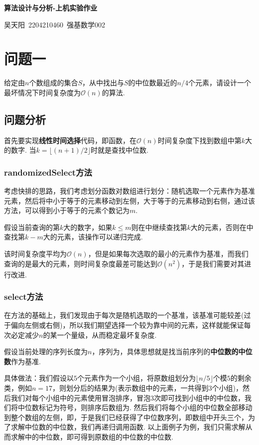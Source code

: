 \documentclass[12pt, a4paper, oneside]{ctexart}
\numberwithin{equation}{section}  %
\newenvironment{myTitle}[1]{
    \begin{center}
    {\zihao{-2}\bf #1\\}
    \zihao{-4}\it
}{\end{center}}  %
\let\leq=\leqslant %
\def\O{\mathcal{O}}          %
\begin{document}
\begin{myTitle}{算法设计与分析-上机实验作业}
    吴天阳\ 2204210460\ 强基数学002
\end{myTitle}
\section{问题一}
给定由$n$个数组成的集合$S$，从中找出与$S$的中位数最近的$n/4$个元素，请设计一个最坏情况下时间复杂度为$\O(n)$的算法.
\subsection{问题分析}
首先要实现\textbf{线性时间选择}代码，即函数，在$\O(n)$时间复杂度下找到数组中第$k$大的数字. 当$k = \lfloor(n+1)/2\rfloor$时就是查找中位数.

\subsubsection{randomizedSelect方法}
考虑快排的思路，我们考虑划分函数对数组进行划分：随机选取一个元素作为基准元素，然后将中小于等于的元素移动到左侧，大于等于的元素移动到右侧，通过该方法，可以得到小于等于的元素个数记为$m$.

假设当前查询的第$k$大的数字，如果$k\leq m$则在中继续查找第$k$大的元素，否则在中查找第$k-m$大的元素，该操作可以递归完成.

该时间复杂度平均为$\O(n)$，但是如果每次选取的最小的元素作为基准，而我们查询的是最大的元素，则时间复杂度最差可能达到$\O(n^2)$，于是我们需要对其进行改进.
\subsubsection{select方法}
在方法的基础上，我们发现由于每次是随机选取的一个基准，该基准可能较差(过于偏向左侧或右侧)，所以我们期望选择一个较为靠中间的元素，这样就能保证每次必定减少$n$的某一个量级，从而稳定最坏复杂度.

假设当前处理的序列长度为$n$，序列为，具体思想就是找当前序列的\textbf{中位数的中位数}作为基准.

具体做法：我们假设以$5$个元素作为一个小组，将原数组划分为$\lfloor n/5\rfloor$个模$5$的剩余类，例如$n=17$，则划分后的结果为\cppinline{[*****|*****|*****|**]}(\cppinline{*}表示数组中的元素，一共得到$3$个小组)，然后我们对每个小组中的元素使用冒泡排序，冒泡$3$次即可找到小组中的中位数，我们将中位数标记为\cppinline{$}符号，则排序后数组为\cppinline{[**$**|**$**|**$**|**]}. 然后我们将每个小组的中位数全部移动到整个数组的左侧，即\cppinline{[$$$**|*****|*****|**]}，于是我们已经获得了中位数序列，即数组中开头三个，为了求解中位数的中位数，我们再递归调用函数. 以上面例子为例，我们只需求解从而求解\cppinline{[$$$]}中的中位数，即可得到原数组的中位数的中位数.
\end{document}
